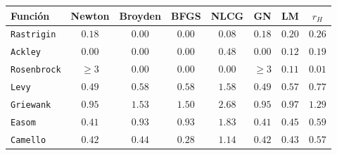 \begin{tabular}{l c c c c c c c}
\toprule
\rowcolor{Azul1!50}
Función & Newton & Broyden & BFGS & NLCG & GN & LM & $r_H$ \\
\midrule
\texttt{Rastrigin} & $0.18$ & $0.00$ & $0.00$ & $0.08$ & $0.18$ & $0.20$ & $0.26$ \\
\texttt{Ackley} & $0.00$ & $0.00$ & $0.00$ & $0.48$ & $0.00$ & $0.12$ & $0.19$ \\
\texttt{Rosenbrock} & $\ge3$ & $0.00$ & $0.00$ & $0.00$ & $\ge3$ & $0.11$ & $0.01$ \\
\texttt{Levy} & $0.49$ & $0.58$ & $0.58$ & $1.58$ & $0.49$ & $0.57$ & $0.77$ \\
\texttt{Griewank} & $0.95$ & $1.53$ & $1.50$ & $2.68$ & $0.95$ & $0.97$ & $1.29$ \\
\texttt{Easom} & $0.41$ & $0.93$ & $0.93$ & $1.83$ & $0.41$ & $0.45$ & $0.59$ \\
\texttt{Camello} & $0.42$ & $0.44$ & $0.28$ & $1.14$ & $0.42$ & $0.43$ & $0.57$ \\
\bottomrule
\end{tabular}
